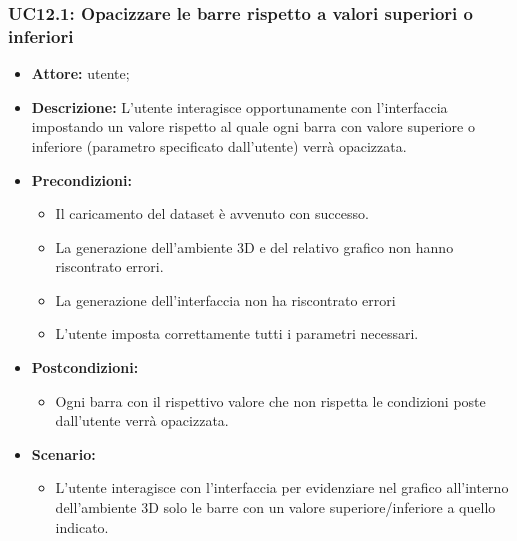 \subsubsection{UC12.1: Opacizzare le barre rispetto a valori superiori o inferiori}
\begin{itemize}    
    \item \textbf{Attore:} utente;
    \item \textbf{Descrizione:} L'utente interagisce opportunamente con l'interfaccia impostando un valore rispetto al quale ogni barra con valore superiore o inferiore (parametro specificato dall'utente) verrà opacizzata.
    \item \textbf{Precondizioni:}    
        \begin{itemize}
            \item Il caricamento del dataset è avvenuto con successo.
            \item La generazione dell'ambiente 3D e del relativo grafico non hanno riscontrato errori.
            \item La generazione dell'interfaccia non ha riscontrato errori
            \item L'utente imposta correttamente tutti i parametri necessari.
        \end{itemize}    
    \item \textbf{Postcondizioni:}
        \begin{itemize}
            \item Ogni barra con il rispettivo valore che non rispetta le condizioni poste dall'utente verrà opacizzata.
        \end{itemize}    
    \item \textbf{Scenario:} 
        \begin{itemize}
            \item L'utente interagisce con l'interfaccia per evidenziare nel grafico all'interno dell'ambiente 3D solo le barre con un valore superiore/inferiore a quello indicato.
        \end{itemize}
\end{itemize}

